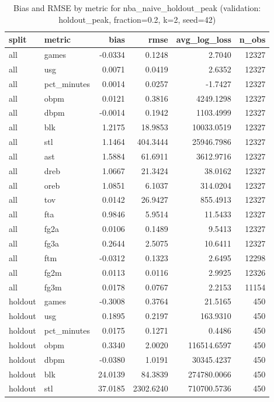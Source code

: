 \begin{table}
\caption{Bias and RMSE by metric for nba_naive_holdout_peak (validation: holdout_peak, fraction=0.2, k=2, seed=42)}
\label{tab:nba_naive_holdout_peak_vs_holdout_peak_f20_k2_s42_bias_rmse}
\begin{tabular}{llrrrr}
\toprule
split & metric & bias & rmse & avg\_log\_loss & n\_obs \\
\midrule
all & games & -0.0334 & 0.1248 & 2.7040 & 12327 \\
all & usg & 0.0071 & 0.0419 & 2.6352 & 12327 \\
all & pct\_minutes & 0.0014 & 0.0257 & -1.7427 & 12327 \\
all & obpm & 0.0121 & 0.3816 & 4249.1298 & 12327 \\
all & dbpm & -0.0014 & 0.1942 & 1103.4999 & 12327 \\
all & blk & 1.2175 & 18.9853 & 10033.0519 & 12327 \\
all & stl & 1.1464 & 404.3444 & 25946.7986 & 12327 \\
all & ast & 1.5884 & 61.6911 & 3612.9716 & 12327 \\
all & dreb & 1.0667 & 21.3424 & 38.0162 & 12327 \\
all & oreb & 1.0851 & 6.1037 & 314.0204 & 12327 \\
all & tov & 0.0142 & 26.9427 & 855.4913 & 12327 \\
all & fta & 0.9846 & 5.9514 & 11.5433 & 12327 \\
all & fg2a & 0.0106 & 0.1489 & 9.5413 & 12327 \\
all & fg3a & 0.2644 & 2.5075 & 10.6411 & 12327 \\
all & ftm & -0.0312 & 0.1323 & 2.6495 & 12298 \\
all & fg2m & 0.0113 & 0.0116 & 2.9925 & 12326 \\
all & fg3m & 0.0178 & 0.0767 & 2.2153 & 11154 \\
holdout & games & -0.3008 & 0.3764 & 21.5165 & 450 \\
holdout & usg & 0.1895 & 0.2197 & 163.9310 & 450 \\
holdout & pct\_minutes & 0.0175 & 0.1271 & 0.4486 & 450 \\
holdout & obpm & 0.3340 & 2.0020 & 116514.6597 & 450 \\
holdout & dbpm & -0.0380 & 1.0191 & 30345.4237 & 450 \\
holdout & blk & 24.0139 & 84.3839 & 274780.0066 & 450 \\
holdout & stl & 37.0185 & 2302.6240 & 710700.5736 & 450 \\

\end{tabular}
\end{table}
